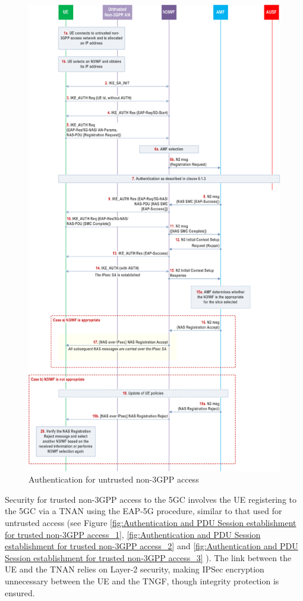 \begin{figure}
    \centering
    \includegraphics[width=0.75\linewidth]{figs/Authentication for untrusted non-3GPP access.png}
    \caption{Authentication for untrusted non-\ac{3GPP} access}
    \label{fig:Authentication for untrusted non-3GPP access}
\end{figure}

Security for trusted non-\ac{3GPP} access to the \ac{5GC} involves the \ac{UE} registering to the \ac{5GC} via a \ac{TNAN} using the \ac{EAP-5G} procedure, similar to that used for untrusted access (see Figure \ref{fig:Authentication and PDU Session establishment for trusted non-3GPP access_1}, \ref{fig:Authentication and PDU Session establishment for trusted non-3GPP access_2} and \ref{fig:Authentication and PDU Session establishment for trusted non-3GPP access_3} ). The link between the \ac{UE} and the \ac{TNAN} relies on Layer-2 security, making \ac{IPSec} encryption unnecessary between the \ac{UE} and the \ac{TNGF}, though integrity protection is ensured.

